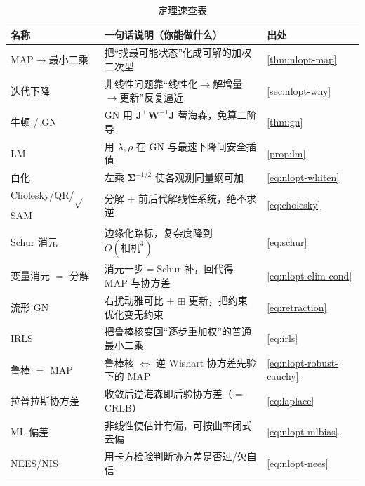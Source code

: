 \begin{table}[H]\centering\small
\caption{定理速查表}
\begin{tabular}{lll}
\toprule
名称 & 一句话说明（你能做什么） & 出处 \\
\midrule
MAP$\to$最小二乘 & 把“找最可能状态”化成可解的加权二次型 & \cref{thm:nlopt-map} \\
迭代下降 & 非线性问题靠“线性化$\to$解增量$\to$更新”反复逼近 & \cref{sec:nlopt-why} \\
牛顿 / GN & GN 用 $\mathbf{J}^\top\mathbf{W}^{-1}\mathbf{J}$ 替海森，免算二阶导 & \cref{thm:gn} \\
LM & 用 $\lambda,\rho$ 在 GN 与最速下降间安全插值 & \cref{prop:lm} \\
白化 & 左乘 $\boldsymbol{\Sigma}^{-1/2}$ 使各观测同量纲可加 & \cref{eq:nlopt-whiten} \\
Cholesky/QR/$\sqrt{}$SAM & 分解 $+$ 前后代解线性系统，绝不求逆 & \cref{eq:cholesky} \\
Schur 消元 & 边缘化路标，复杂度降到 $O(\text{相机}^3)$ & \cref{eq:schur} \\
变量消元 $=$ 分解 & 消元一步$=$Schur 补，回代得 MAP 与协方差 & \cref{eq:nlopt-elim-cond} \\
流形 GN & 右扰动雅可比 $+$ $\boxplus$ 更新，把约束优化变无约束 & \cref{eq:retraction} \\
IRLS & 把鲁棒核变回“逐步重加权”的普通最小二乘 & \cref{eq:irls} \\
鲁棒 $=$ MAP & 鲁棒核 $\Leftrightarrow$ 逆 Wishart 协方差先验下的 MAP & \cref{eq:nlopt-robust-cauchy} \\
拉普拉斯协方差 & 收敛后逆海森即后验协方差（$=$ CRLB） & \cref{eq:laplace} \\
ML 偏差 & 非线性使估计有偏，可按曲率闭式去偏 & \cref{eq:nlopt-mlbias} \\
NEES/NIS & 用卡方检验判断协方差是否过/欠自信 & \cref{eq:nlopt-nees} \\
\bottomrule
\end{tabular}
\end{table}

